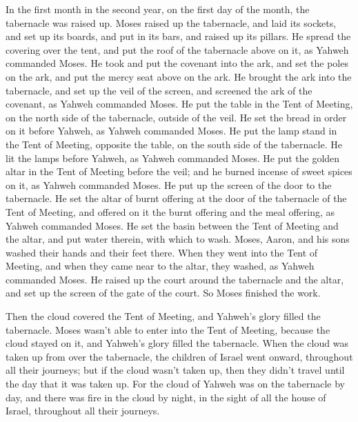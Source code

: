  In the first month in the second year, on the first day
of the month, the tabernacle was raised up.  Moses raised
up the tabernacle, and laid its sockets, and set up its boards, and put
in its bars, and raised up its pillars.  He spread the
covering over the tent, and put the roof of the tabernacle above on it,
as Yahweh commanded Moses.  He took and put the covenant
into the ark, and set the poles on the ark, and put the mercy seat above
on the ark.  He brought the ark into the tabernacle, and
set up the veil of the screen, and screened the ark of the covenant, as
Yahweh commanded Moses.  He put the table in the Tent of
Meeting, on the north side of the tabernacle, outside of the veil.
 He set the bread in order on it before Yahweh, as Yahweh
commanded Moses.  He put the lamp stand in the Tent of
Meeting, opposite the table, on the south side of the tabernacle.
 He lit the lamps before Yahweh, as Yahweh commanded
Moses.  He put the golden altar in the Tent of Meeting
before the veil;  and he burned incense of sweet spices
on it, as Yahweh commanded Moses.  He put up the screen
of the door to the tabernacle.  He set the altar of burnt
offering at the door of the tabernacle of the Tent of Meeting, and
offered on it the burnt offering and the meal offering, as Yahweh
commanded Moses.  He set the basin between the Tent of
Meeting and the altar, and put water therein, with which to wash.
 Moses, Aaron, and his sons washed their hands and their
feet there.  When they went into the Tent of Meeting, and
when they came near to the altar, they washed, as Yahweh commanded
Moses.  He raised up the court around the tabernacle and
the altar, and set up the screen of the gate of the court. So Moses
finished the work.

 Then the cloud covered the Tent of Meeting, and Yahweh's
glory filled the tabernacle.  Moses wasn't able to enter
into the Tent of Meeting, because the cloud stayed on it, and Yahweh's
glory filled the tabernacle.  When the cloud was taken up
from over the tabernacle, the children of Israel went onward, throughout
all their journeys;  but if the cloud wasn't taken up,
then they didn't travel until the day that it was taken up.
 For the cloud of Yahweh was on the tabernacle by day,
and there was fire in the cloud by night, in the sight of all the house
of Israel, throughout all their journeys.
